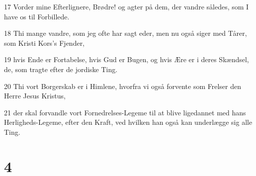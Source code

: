 \par 17 Vorder mine Efterlignere, Brødre! og agter på dem, der vandre således, som I have os til Forbillede.
\par 18 Thi mange vandre, som jeg ofte har sagt eder, men nu også siger med Tårer, som Kristi Kors's Fjender,
\par 19 hvis Ende er Fortabelse, hvis Gud er Bugen, og hvis Ære er i deres Skændsel, de, som tragte efter de jordiske Ting.
\par 20 Thi vort Borgerskab er i Himlene, hvorfra vi også forvente som Frelser den Herre Jesus Kristus,
\par 21 der skal forvandle vort Fornedrelses-Legeme til at blive ligedannet med hans Herligheds-Legeme, efter den Kraft, ved hvilken han også kan underlægge sig alle Ting.

\chapter{4}

